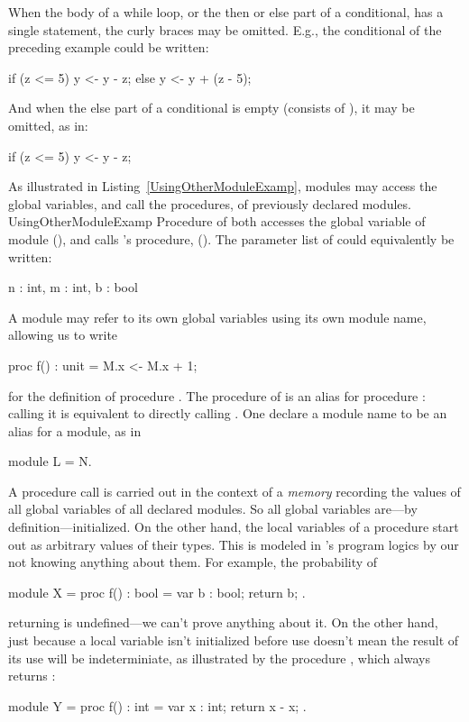 When the body of a while loop, or the then or else part of a conditional,
has a single statement, the curly braces may be omitted. E.g., the
conditional of the preceding example could be written:
\begin{easycrypt}{}{}
if (z <= 5) y <- y - z;
else y <- y + (z - 5);
\end{easycrypt}
And when the else part of a conditional is empty (consists of
\ec{\{\}}), it may be omitted, as in:
\begin{easycrypt}{}{}
if (z <= 5) y <- y - z;
\end{easycrypt}

As illustrated in Listing~\ref{UsingOtherModuleExamp}, modules may
access the global variables, and call the procedures, of previously
declared modules.
 {}{UsingOtherModuleExamp} Procedure
 of  both accesses the global variable  of module
 (), and calls 's procedure,  ().
The parameter list of  could equivalently be written:
\begin{easycrypt}{}{}
n : int, m : int, b : bool  
\end{easycrypt}
A module may refer to its own global variables using its own module
name, allowing us to write
\begin{easycrypt}{}{}
proc f() : unit = {
  M.x <- M.x + 1;
}
\end{easycrypt}
for the definition of procedure .  The procedure  of
 is an alias for procedure : calling it is equivalent to
directly calling .
One declare a module name to be an alias for a module, as in
\begin{easycrypt}{}{}
module L = N.
\end{easycrypt}

A procedure call is carried out in the context of a \emph{memory}
recording the values of all global variables of all declared modules.
So all global variables are---by definition---initialized. On the
other hand, the local variables of a procedure start out as arbitrary
values of their types.  This is modeled in \EasyCrypt's program logics
by our not knowing anything about them. For example, the probability
of 
\begin{easycrypt}{}{}
module X = {
  proc f() : bool = {
    var b : bool;
    return b;
  }
}.
\end{easycrypt}
returning  is undefined---we can't prove anything about it.
On the other hand, just because a local variable isn't initialized
before use doesn't mean the result of its use will be indeterminiate,
as illustrated by the procedure , which always returns :
\begin{easycrypt}{}{}
module Y = {
  proc f() : int = {
    var x : int;
    return x - x;
  }
}.
\end{easycrypt}

